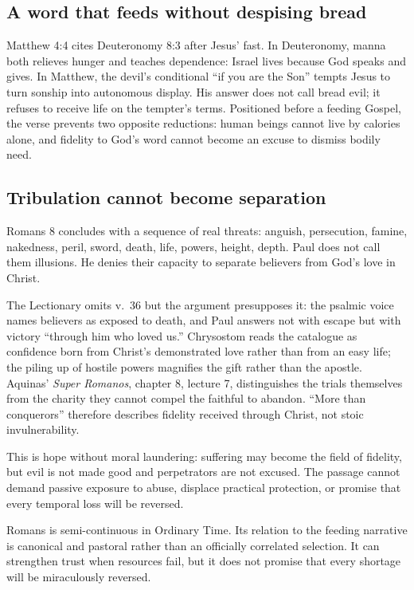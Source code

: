 \subsection*{A word that feeds without despising bread\enspace{}}
Matthew 4:4 cites Deuteronomy 8:3 after Jesus' fast. In Deuteronomy, manna
both relieves hunger and teaches dependence: Israel lives because God speaks
and gives. In Matthew, the devil's conditional ``if you are the Son'' tempts
Jesus to turn sonship into autonomous display. His answer does not call bread
evil; it refuses to receive life on the tempter's terms. Positioned before a
feeding Gospel, the verse prevents two opposite reductions: human beings
cannot live by calories alone, and fidelity to God's word cannot become an
excuse to dismiss bodily need.

\subsection*{Tribulation cannot become separation\enspace{}}
Romans 8 concludes with a sequence of real threats: anguish, persecution, famine, nakedness, peril, sword, death, life, powers, height, depth. Paul does not call them illusions. He denies their capacity to separate believers from God's love in Christ.

The Lectionary omits v.~36 but the argument presupposes it: the psalmic voice
names believers as exposed to death, and Paul answers not with escape but
with victory ``through him who loved us.'' Chrysostom reads the catalogue as
confidence born from Christ's demonstrated love rather than from an easy
life; the piling up of hostile powers magnifies the gift rather than the
apostle. Aquinas' \emph{Super Romanos}, chapter 8, lecture 7, distinguishes
the trials themselves from the charity they cannot compel the faithful to
abandon. ``More than conquerors'' therefore describes fidelity received
through Christ, not stoic invulnerability.

This is hope without moral laundering: suffering may become the field of
fidelity, but evil is not made good and perpetrators are not excused. The
passage cannot demand passive exposure to abuse, displace practical
protection, or promise that every temporal loss will be reversed.

Romans is semi-continuous in Ordinary Time. Its relation to the feeding narrative is canonical and pastoral rather than an officially correlated selection. It can strengthen trust when resources fail, but it does not promise that every shortage will be miraculously reversed.

